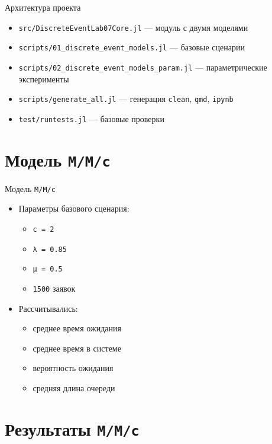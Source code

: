 \documentclass[
  ignorenonframetext,
  aspectratio=169,
  russian,
]{beamer}
\providecommand{\tightlist}{%
  \setlength{\itemsep}{0pt}\setlength{\parskip}{0pt}}\usepackage{longtable,booktabs,array}
\begin{document}
\begin{frame}[fragile]{Архитектура проекта}
\begin{itemize}[<+->]
\tightlist
\item
  \texttt{src/DiscreteEventLab07Core.jl} --- модуль с двумя моделями
\item
  \texttt{scripts/01\_discrete\_event\_models.jl} --- базовые сценарии
\item
  \texttt{scripts/02\_discrete\_event\_models\_param.jl} ---
  параметрические эксперименты
\item
  \texttt{scripts/generate\_all.jl} --- генерация \texttt{clean},
  \texttt{qmd}, \texttt{ipynb}
\item
  \texttt{test/runtests.jl} --- базовые проверки
\end{itemize}
\end{frame}

\section{\texorpdfstring{Модель
\texttt{M/M/c}}{Модель M/M/c}}\label{ux43cux43eux434ux435ux43bux44c-mmc}

\begin{frame}[fragile]{Модель \texttt{M/M/c}}
\begin{itemize}[<+->]
\tightlist
\item
  Параметры базового сценария:

  \begin{itemize}[<+->]
  \tightlist
  \item
    \texttt{c\ =\ 2}
  \item
    \texttt{λ\ =\ 0.85}
  \item
    \texttt{μ\ =\ 0.5}
  \item
    \texttt{1500} заявок
  \end{itemize}
\item
  Рассчитывались:

  \begin{itemize}[<+->]
  \tightlist
  \item
    среднее время ожидания
  \item
    среднее время в системе
  \item
    вероятность ожидания
  \item
    средняя длина очереди
  \end{itemize}
\end{itemize}
\end{frame}

\section{\texorpdfstring{Результаты
\texttt{M/M/c}}{Результаты M/M/c}}\label{ux440ux435ux437ux443ux43bux44cux442ux430ux442ux44b-mmc}
\end{document}
